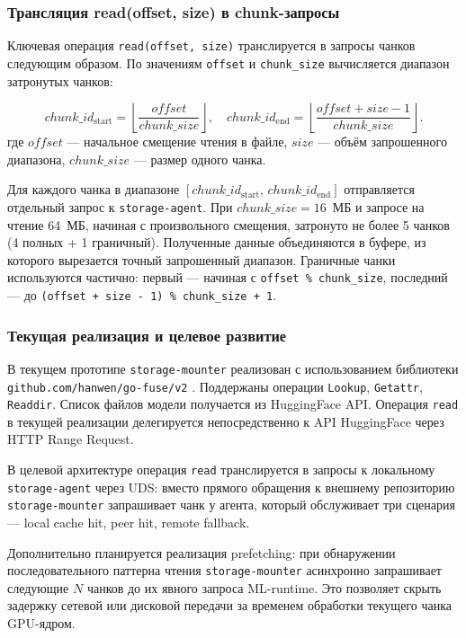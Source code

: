 \subsubsection{Трансляция read(offset, size) в chunk-запросы}

Ключевая операция \texttt{read(offset, size)} транслируется в запросы чанков следующим образом. По значениям \texttt{offset} и \texttt{chunk\_size} вычисляется диапазон затронутых чанков:

\begin{equation}
chunk\_id_{\mathrm{start}} = \left\lfloor \frac{offset}{chunk\_size} \right\rfloor, \quad
chunk\_id_{\mathrm{end}} = \left\lfloor \frac{offset + size - 1}{chunk\_size} \right\rfloor.
\label{eq:chunk_range}
\end{equation}
где $offset$ --- начальное смещение чтения в файле, $size$ --- объём запрошенного диапазона, $chunk\_size$ --- размер одного чанка.

Для каждого чанка в диапазоне $[chunk\_id_{\mathrm{start}},\, chunk\_id_{\mathrm{end}}]$ отправляется отдельный запрос к \texttt{storage-agent}. При $chunk\_size = 16$~МБ и запросе на чтение 64~МБ, начиная с произвольного смещения, затронуто не более 5 чанков (4 полных + 1 граничный). Полученные данные объединяются в буфере, из которого вырезается точный запрошенный диапазон. Граничные чанки используются частично: первый --- начиная с \texttt{offset \% chunk\_size}, последний --- до \texttt{(offset + size - 1) \% chunk\_size + 1}.

\subsubsection{Текущая реализация и целевое развитие}

В текущем прототипе \texttt{storage-mounter} реализован с использованием библиотеки \texttt{github.com/hanwen/go-fuse/v2} \cite{gofuse}. Поддержаны операции \texttt{Lookup}, \texttt{Getattr}, \texttt{Readdir}. Список файлов модели получается из HuggingFace API. Операция \texttt{read} в текущей реализации делегируется непосредственно к API HuggingFace через HTTP Range Request.

В целевой архитектуре операция \texttt{read} транслируется в запросы к локальному \texttt{storage-agent} через UDS: вместо прямого обращения к внешнему репозиторию \texttt{storage-mounter} запрашивает чанк у агента, который обслуживает три сценария --- local cache hit, peer hit, remote fallback.

Дополнительно планируется реализация prefetching: при обнаружении последовательного паттерна чтения \texttt{storage-mounter} асинхронно запрашивает следующие $N$ чанков до их явного запроса ML-runtime. Это позволяет скрыть задержку сетевой или дисковой передачи за временем обработки текущего чанка GPU-ядром.

